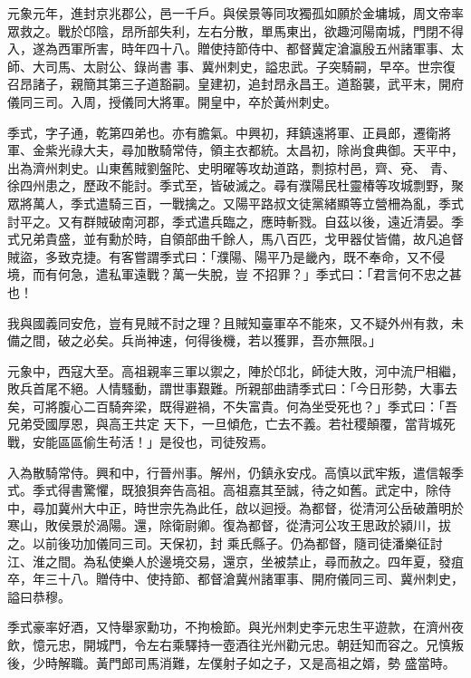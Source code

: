 \begin{pinyinscope}
 元象元年，進封京兆郡公，邑一千戶。與侯景等同攻獨孤如願於金墉城，周文帝率眾救之。戰於邙陰，昂所部失利，左右分散，單馬東出，欲趣河陽南城，門閉不得入，遂為西軍所害，時年四十八。贈使持節侍中、都督冀定滄瀛殷五州諸軍事、太師、大司馬、太尉公、錄尚書
 事、冀州刺史，謚忠武。子突騎嗣，早卒。世宗復召昂諸子，親簡其第三子道豁嗣。皇建初，追封昂永昌王。道豁襲，武平末，開府儀同三司。入周，授儀同大將軍。開皇中，卒於黃州刺史。



 季式，字子通，乾第四弟也。亦有膽氣。中興初，拜鎮遠將軍、正員郎，遷衛將軍、金紫光祿大夫，尋加散騎常侍，領主衣都統。太昌初，除尚食典御。天平中，出為濟州刺史。山東舊賊劉盤陀、史明曜等攻劫道路，剽掠村邑，齊、兗、
 青、徐四州患之，歷政不能討。季式至，皆破滅之。尋有濮陽民杜靈椿等攻城剽野，聚眾將萬人，季式遣騎三百，一戰擒之。又陽平路叔文徒黨緒顯等立營柵為亂，季式討平之。又有群賊破南河郡，季式遣兵臨之，應時斬戮。自茲以後，遠近清晏。季式兄弟貴盛，並有勳於時，自領部曲千餘人，馬八百匹，戈甲器仗皆備，故凡追督賊盜，多致克捷。有客嘗謂季式曰：「濮陽、陽平乃是畿內，既不奉命，又不侵境，而有何急，遣私軍遠戰？萬一失脫，豈
 不招罪？」季式曰：「君言何不忠之甚也！



 我與國義同安危，豈有見賊不討之理？且賊知臺軍卒不能來，又不疑外州有救，未備之間，破之必矣。兵尚神速，何得後機，若以獲罪，吾亦無限。」



 元象中，西寇大至。高祖親率三軍以禦之，陣於邙北，師徒大敗，河中流尸相繼，敗兵首尾不絕。人情騷動，謂世事艱難。所親部曲請季式曰：「今日形勢，大事去矣，可將腹心二百騎奔梁，既得避禍，不失富貴。何為坐受死也？」季式曰：「吾兄弟受國厚恩，與高王共定
 天下，一旦傾危，亡去不義。若社稷顛覆，當背城死戰，安能區區偷生茍活！」是役也，司徒歿焉。



 入為散騎常侍。興和中，行晉州事。解州，仍鎮永安戍。高慎以武牢叛，遣信報季式。季式得書驚懼，既狼狽奔告高祖。高祖嘉其至誠，待之如舊。武定中，除侍中，尋加冀州大中正，時世宗先為此任，啟以迴授。為都督，從清河公岳破蕭明於寒山，敗侯景於渦陽。還，除衛尉卿。復為都督，從清河公攻王思政於潁川，拔之。以前後功加儀同三司。天保初，封
 乘氏縣子。仍為都督，隨司徒潘樂征討江、淮之間。為私使樂人於邊境交易，還京，坐被禁止，尋而赦之。四年夏，發疽卒，年三十八。贈侍中、使持節、都督滄冀州諸軍事、開府儀同三司、冀州刺史，謚曰恭穆。



 季式豪率好酒，又恃舉家勳功，不拘檢節。與光州刺史李元忠生平遊款，在濟州夜飲，憶元忠，開城門，令左右乘驛持一壺酒往光州勸元忠。朝廷知而容之。兄慎叛後，少時解職。黃門郎司馬消難，左僕射子如之子，又是高祖之婿，勢
 盛當時。




\end{pinyinscope}
